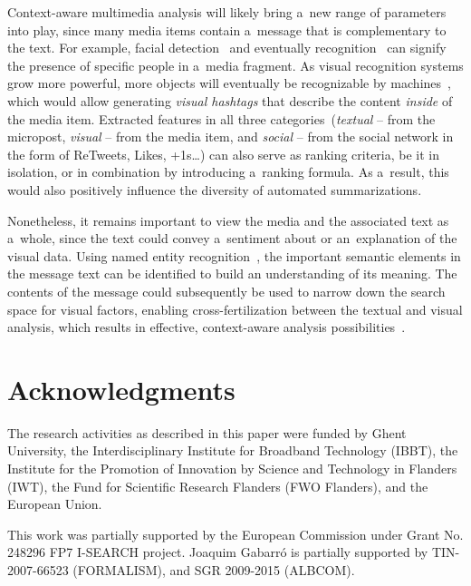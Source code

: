 \documentclass{acm_proc_article-sp}
\let\oldemph\emph
\renewcommand{\emph}[1]{\oldemph{\fontsize{9}{9}\selectfont #1}}
\newcommand{\inlinelistingsize}{\fontsize{8pt}{11pt}}
\let\oldttdefault\ttdefault
\renewcommand{\ttdefault}{pcr}
\let\oldurl\url
\renewcommand{\url}[1]{\inlinelistingsize\oldurl{#1}}
\begin{document}
Context-aware multimedia analysis will likely bring a~new range of parameters into play,
since many media items contain a~message that is complementary to the text.
For example, facial detection~\cite{ViolaJones} and eventually recognition~\cite{Wright}
can signify the presence of specific people in a~media fragment.
As visual recognition systems grow more powerful, more objects will eventually be recognizable by machines~\cite{Serre},
which would allow generating \emph{visual hashtags} that describe the content \emph{inside} of the media item.
Extracted features in all three categories~(\emph{textual} -- from the micropost,
\emph{visual} -- from the media item,
and \emph{social} -- from the social network in the form of ReTweets, Likes, +1s\ldots)
can also
serve as ranking criteria, be it in isolation, or in combination by
introducing a~ranking formula.
As a~result, this would also positively influence the diversity of automated summarizations.

Nonetheless, it remains important to view the media and the associated text as a~whole,
since the text could convey a~sentiment about or an~explanation of the visual data.
Using named entity recognition~\cite{NERD,AddingMeaningToMicroposts}, the important semantic elements in the message text can be identified to build an understanding of its meaning.
The contents of the message could subsequently be used to narrow down the search space for visual factors, enabling cross-fertilization between the textual and visual analysis, which results in effective, context-aware analysis possibilities~\cite{verborgh_mtap_2011}.


\section*{Acknowledgments}
The research activities as described in this paper were funded by Ghent University, the Interdisciplinary Institute for Broadband Technology (IBBT), the Institute for the Promotion of Innovation by Science and Technology in Flanders (IWT), the Fund for Scientific Research Flanders (FWO Flanders), and the European Union.

This work was partially supported by the European Commission under Grant No. 248296 FP7 \mbox{I-SEARCH} project.
Joaquim Gabarr\'o is partially supported by TIN-2007-66523 (FORMALISM), and SGR 2009-2015 (\mbox{ALBCOM}).


\let\ttdefault\oldttdefault
\let\url\oldurl




\balancecolumns
\end{document}
